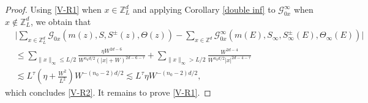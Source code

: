 \documentclass{article}
\newcommand{\1}{\mathds{1}}
\numberwithin{equation}{section}
\newcommand{\be}{\begin{equation}}
\newcommand{\ee}{\end{equation}}
\renewcommand{\cal}{\mathcal}
\renewcommand{\leq}{\leqslant}
\renewcommand{\le}{\leq}
\newcommand{\Z}{\mathbb{Z}}
\theoremstyle{plain} %
\theoremstyle{remark}
\newcommand{\Selekl}{{\mathcal E}^{[\eta]}}
\newcommand{\Seleinf}{{\mathcal E}^{\infty}}
\begin{document}
\begin{proof}
Using \eqref{V-R1} when $x\in \Z_L^d$ and applying Corollary \ref{double inf} to $\cal G^\infty_{0x}$ when $x\notin \Z_L^d$, we obtain that
\begin{align*}
 &\bigg|\sum_{x\in \Z_L^d}  \cal G_{0x}(m(z),S, S^{\pm}(z),\Theta(z))-\sum_{x\in \Z^d} \cal G^\infty_{0x}( m(E), S_\infty,  S_\infty^{\pm}(E), \Theta_\infty(E)) \bigg| \\
& \le \sum_{\|x\|_\infty \le L/2} \frac{\eta W^{2d-6}}{W^{n_0d/2}(|x|+W)^{2d-6-\tau}}  + \sum_{\|x\|_\infty > L/2}\frac{W^{2d-4 } }{W^{n_0d/2}|x|^{2d-4-\tau}}  \\
& \lesssim L^\tau \left(\eta + \frac{W^2}{L^2}\right)W^{-(n_0-2)d/2}  \lesssim L^\tau \eta W^{-(n_0-2)d/2}  ,
\end{align*}
which concludes \eqref{V-R2}. It remains to prove \eqref{V-R1}. %


 



\end{proof}
\end{document}
